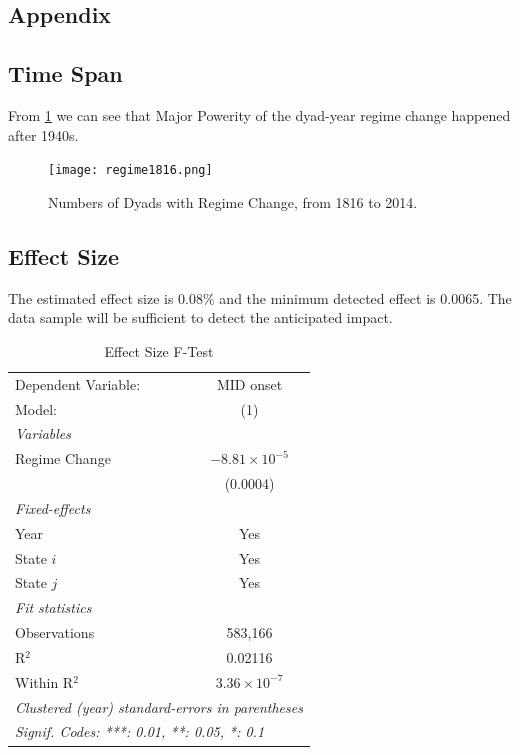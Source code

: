 \documentclass[12pt,a4paper]{article}
\begin{document}
\begin{appendices}

\section{Appendix}
\subsection{Time Span}\label{app1}
From \ref{fig:regime1816} we can see that Major Powerity of the dyad-year regime change happened after 1940s. 
\begin{figure}[!hptb]
\centering
\texttt{[image: regime1816.png]}
\caption{\label{fig:regime1816}Numbers of Dyads with Regime Change, from 1816 to 2014.}
\end{figure}

\subsection{Effect Size}\label{app2}
The estimated effect size is $0.08\%$ and the minimum detected effect is 0.0065. The data sample will be sufficient to detect the anticipated impact.

\begin{table}[!hptb]
\centering
\caption{Effect Size F-Test\label{efsize}}
\begin{tabular}{lc}
   \tabularnewline \midrule \midrule
   Dependent Variable: & MID onset\\  
   Model:              & (1)\\  
   \midrule
   \emph{Variables}\\
   Regime Change         & $-8.81\times 10^{-5}$\\    
                       & (0.0004)\\   
   \midrule
   \emph{Fixed-effects}\\
   Year                & Yes\\  
   State $i$              & Yes\\  
   State $j$              & Yes\\  
   \midrule
   \emph{Fit statistics}\\
   Observations        & 583,166\\  
   R$^2$               & 0.02116\\  
   Within R$^2$        & $3.36\times 10^{-7}$\\   
   \midrule \midrule
   \multicolumn{2}{l}{\emph{Clustered (year) standard-errors in parentheses}}\\
   \multicolumn{2}{l}{\emph{Signif. Codes: ***: 0.01, **: 0.05, *: 0.1}}\\
\end{tabular}
\end{table}


\end{appendices}
\end{document}
